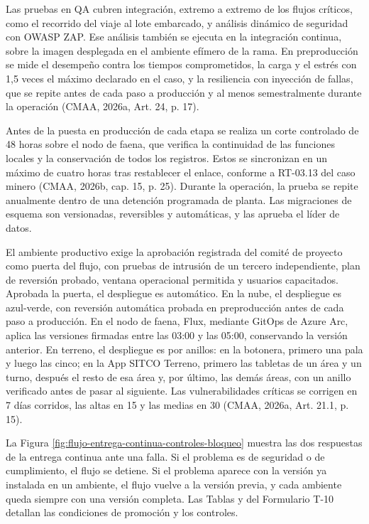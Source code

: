 \documentclass[subdoc]{../../comun/overfore}
\begin{document}
Las pruebas en QA cubren integración, extremo a extremo de los flujos críticos, como el recorrido del viaje al lote embarcado, y análisis dinámico de seguridad con OWASP ZAP. Ese análisis también se ejecuta en la integración continua, sobre la imagen desplegada en el ambiente efímero de la rama. En preproducción se mide el desempeño contra los tiempos comprometidos, la carga y el estrés con 1,5 veces el máximo declarado en el caso, y la resiliencia con inyección de fallas, que se repite antes de cada paso a producción y al menos semestralmente durante la operación (CMAA, 2026a, Art. 24, p. 17).

Antes de la puesta en producción de cada etapa se realiza un corte controlado de 48 horas sobre el nodo de faena, que verifica la continuidad de las funciones locales y la conservación de todos los registros. Estos se sincronizan en un máximo de cuatro horas tras restablecer el enlace, conforme a RT-03.13 del caso minero (CMAA, 2026b, cap. 15, p. 25). Durante la operación, la prueba se repite anualmente dentro de una detención programada de planta. Las migraciones de esquema son versionadas, reversibles y automáticas, y las aprueba el líder de datos.

El ambiente productivo exige la aprobación registrada del comité de proyecto como puerta del flujo, con pruebas de intrusión de un tercero independiente, plan de reversión probado, ventana operacional permitida y usuarios capacitados. Aprobada la puerta, el despliegue es automático. En la nube, el despliegue es azul-verde, con reversión automática probada en preproducción antes de cada paso a producción. En el nodo de faena, Flux, mediante GitOps de Azure Arc, aplica las versiones firmadas entre las 03:00 y las 05:00, conservando la versión anterior. En terreno, el despliegue es por anillos: en la botonera, primero una pala y luego las cinco; en la App SITCO Terreno, primero las tabletas de un área y un turno, después el resto de esa área y, por último, las demás áreas, con un anillo verificado antes de pasar al siguiente. Las vulnerabilidades críticas se corrigen en 7 días corridos, las altas en 15 y las medias en 30 (CMAA, 2026a, Art. 21.1, p. 15).

La Figura \ref{fig:flujo-entrega-continua-controles-bloqueo} muestra las dos respuestas de la entrega continua ante una falla. Si el problema es de seguridad o de cumplimiento, el flujo se detiene. Si el problema aparece con la versión ya instalada en un ambiente, el flujo vuelve a la versión previa, y cada ambiente queda siempre con una versión completa. Las Tablas  y  del Formulario T-10 detallan las condiciones de promoción y los controles.
\end{document}
